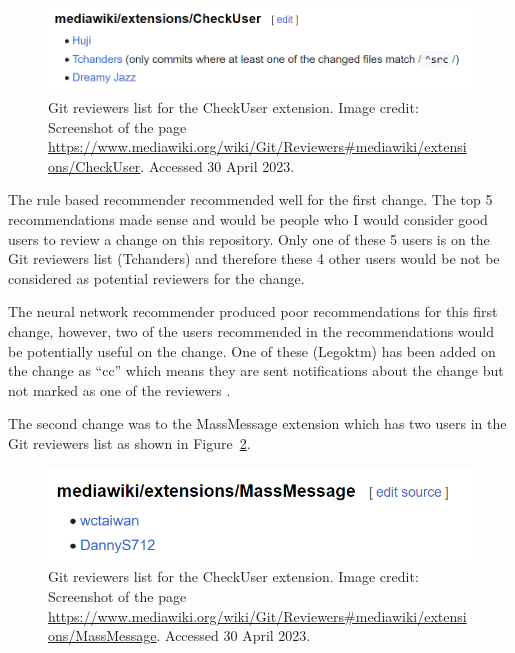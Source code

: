 \begin{figure}[h]
    \centering
    \includegraphics[scale=0.9]{images/git-reviewers-list-checkuser.png}
    \caption[Git reviewers list for the CheckUser extension.]{Git reviewers list for the CheckUser extension. Image credit: Screenshot of the page \url{https://www.mediawiki.org/wiki/Git/Reviewers\#mediawiki/extensions/CheckUser}. Accessed 30 April 2023.}
    \label{fig:checkuser-extension-reviewer-list-for-evaluation}
\end{figure}

The rule based recommender recommended well for the first change. The top 5 recommendations made sense and would be people who I would consider good users to review a change on this repository. Only one of these 5 users is on the Git reviewers list (Tchanders) and therefore these 4 other users would be not be considered as potential reviewers for the change.

The neural network recommender produced poor recommendations for this first change, however, two of the users recommended in the recommendations would be potentially useful on the change. One of these (Legoktm) has been added on the change as ``cc'' which means they are sent notifications about the change but not marked as one of the reviewers \citep{gerrit:cc-meaning}.

The second change was to the MassMessage extension which has two users in the Git reviewers list as shown in Figure~\ref{fig:massmessage-extension-reviewer-list}.

\begin{figure}[h]
    \centering
    \includegraphics[scale=0.9]{images/git-reviewers-list-massmessage.png}
    \caption[Git reviewers list for the MassMessage extension.]{Git reviewers list for the CheckUser extension. Image credit: Screenshot of the page \url{https://www.mediawiki.org/wiki/Git/Reviewers\#mediawiki/extensions/MassMessage}. Accessed 30 April 2023.}
    \label{fig:massmessage-extension-reviewer-list}
\end{figure}

